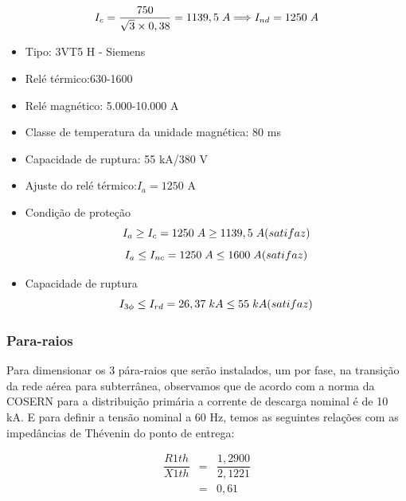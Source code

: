 \begin{equation*}
{I}_{c}=\frac{750}{\sqrt{3}\times 0,38}=1139,5 \hspace{0.1cm}A \Longrightarrow {I}_{nd}=1250 \hspace{0.1cm}A 
\end{equation*}

\begin{itemize}
\item Tipo: 3VT5 H - Siemens
\item Relé térmico:630-1600
\item Relé magnético: 5.000-10.000 A
\item Classe de temperatura da unidade magnética: 80 ms
\item Capacidade de ruptura: 55 kA/380 V
\item Ajuste do relé térmico:${I}_{a}=1250$ A
\item Condição de proteção
\begin{equation*}
{I}_{a} \geq {I}_{c}= 1250 \hspace{0.1cm}A \geq 1139,5 \hspace{0.1cm}A (satifaz) 
\end{equation*}
\begin{equation*}
{I}_{a} \leq {I}_{nc}= 1250 \hspace{0.1cm}A \leq 1600 \hspace{0.1cm}A (satifaz) 
\end{equation*}
\item Capacidade de ruptura
\begin{equation*}
{I}_{3\phi} \leq {I}_{rd}= 26,37 \hspace{0.1cm}kA \leq 55 \hspace{0.1cm}kA (satifaz) 
\end{equation*}
\end{itemize}

\subsubsection{Para-raios}
Para dimensionar os 3 pára-raios que serão instalados, um por fase, na transição da rede aérea para subterrânea, observamos que de acordo com a norma da COSERN para a distribuição primária a corrente de descarga nominal é de 10 kA. E para definir a tensão nominal a 60 Hz, temos as seguintes relações com as impedâncias de Thévenin do ponto de entrega:

\begin{eqnarray*}
\dfrac{R1th}{X1th} &=&  \dfrac{1,2900}{2,1221}\\
	    &=&0,61\\				
\end{eqnarray*} 

